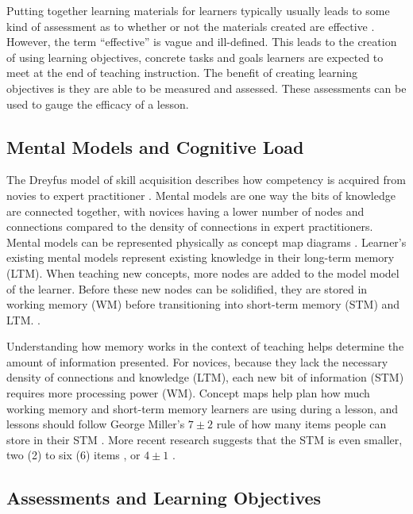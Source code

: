 \documentclass[040-assessment.tex]{subfiles}
\begin{document}
Putting together learning materials for learners typically usually leads to some kind of
assessment as to whether or not the materials created are effective
\cite{ambrose2010learning, wilson2019teaching}.
However, the term ``effective'' is vague and ill-defined.
This leads to the creation of using learning objectives,
concrete tasks and goals learners are expected to meet at the end of teaching instruction.
The benefit of creating learning objectives is they are able to be measured and assessed.
These assessments can be used to gauge the efficacy of a lesson.

\subsection{Mental Models and Cognitive Load}

The Dreyfus model of skill acquisition describes how competency is acquired from
novies to expert practitioner
\cite{dreyfus1980five, bennerUsingDreyfusModel2004}.
Mental models are one way the bits of knowledge are connected together,
with novices having a lower number of nodes and connections compared to the
density of connections in expert practitioners.
Mental models can be represented physically as concept map diagrams
\cite{Koch2016, wilson2019teaching}.
Learner's existing mental models represent existing knowledge in their long-term memory (LTM).
When teaching new concepts,
more nodes are added to the model model of the learner.
Before these new nodes can be solidified, they are stored in working memory (WM)
before transitioning into short-term memory (STM) and LTM.
\cite{Koch2016, hermansProgrammerBrain2021, wilson2019teaching}.

Understanding how memory works in the context of teaching
helps determine the amount of information presented.
For novices, because they lack the necessary density of connections and knowledge (LTM),
each new bit of information (STM) requires more processing power (WM).
Concept maps help plan how much working memory and short-term memory learners are using during a lesson,
and lessons should follow George Miller's $7\pm2$ rule of how many items people can store in their STM
\cite{miller1956magical}.
More recent research suggests that the STM is even smaller, two (2) to six (6) items
\cite{hermansProgrammerBrain2021},
or $4\pm1$ \cite{didauWhatEveryTeacher2016}.

\subsection{Assessments and Learning Objectives}
\end{document}
